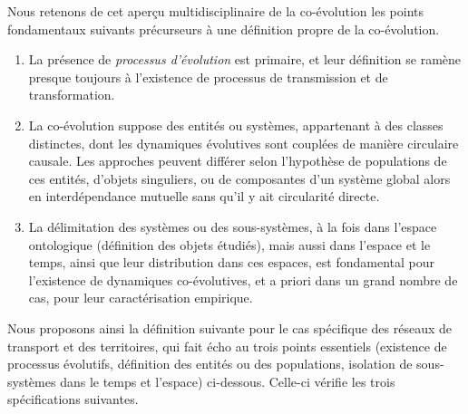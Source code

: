 \documentclass[11pt]{article}
\begin{document}
Nous retenons de cet aperçu multidisciplinaire de la co-évolution les points fondamentaux suivants précurseurs à une définition propre de la co-évolution.

\begin{enumerate}
	\item La présence de \emph{processus d'évolution} est primaire, et leur définition se ramène presque toujours à l'existence de processus de transmission et de transformation.
	\item La co-évolution suppose des entités ou systèmes, appartenant à des classes distinctes, dont les dynamiques évolutives sont couplées de manière circulaire causale. Les approches peuvent différer selon l'hypothèse de populations de ces entités, d'objets singuliers, ou de composantes d'un système global alors en interdépendance mutuelle sans qu'il y ait circularité directe. %
	\item La délimitation des systèmes ou des sous-systèmes, à la fois dans l'espace ontologique (définition des objets étudiés), mais aussi dans l'espace et le temps, ainsi que leur distribution dans ces espaces, est fondamental pour l'existence de dynamiques co-évolutives, et a priori dans un grand nombre de cas, pour leur caractérisation empirique.
\end{enumerate}


Nous proposons ainsi la définition suivante pour le cas spécifique des réseaux de transport et des territoires, qui fait écho au trois points essentiels (existence de processus évolutifs, définition des entités ou des populations, isolation de sous-systèmes dans le temps et l'espace) ci-dessous. Celle-ci vérifie les trois spécifications suivantes.
\end{document}
